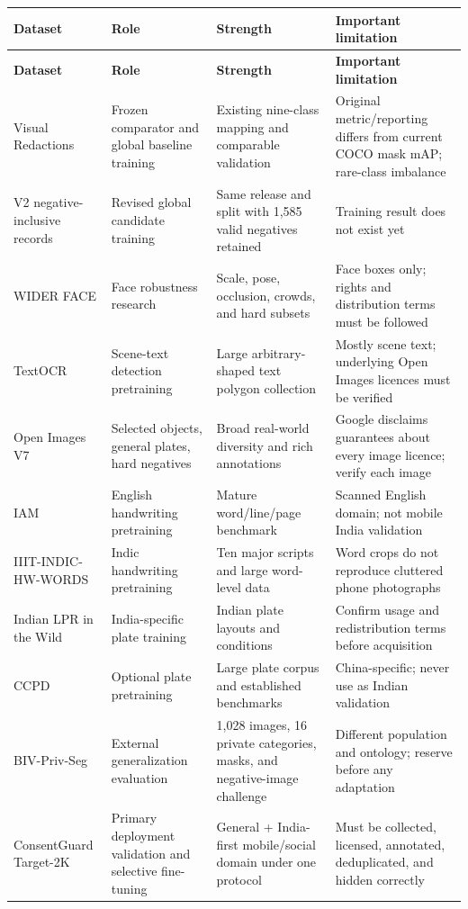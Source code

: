 \begin{longtable}{@{}L{31mm}L{28mm}L{47mm}L{41mm}@{}}
\toprule
\textbf{Dataset} & \textbf{Role} & \textbf{Strength} & \textbf{Important limitation} \\
\midrule
\endfirsthead
\toprule
\textbf{Dataset} & \textbf{Role} & \textbf{Strength} & \textbf{Important limitation} \\
\midrule
\endhead
Visual Redactions & Frozen comparator and global baseline training & Existing nine-class mapping and comparable validation & Original metric/reporting differs from current COCO mask mAP; rare-class imbalance \\
V2 negative-inclusive records & Revised global candidate training & Same release and split with 1,585 valid negatives retained & Training result does not exist yet \\
WIDER FACE & Face robustness research & Scale, pose, occlusion, crowds, and hard subsets & Face boxes only; rights and distribution terms must be followed \\
TextOCR & Scene-text detection pretraining & Large arbitrary-shaped text polygon collection & Mostly scene text; underlying Open Images licences must be verified \\
Open Images V7 & Selected objects, general plates, hard negatives & Broad real-world diversity and rich annotations & Google disclaims guarantees about every image licence; verify each image \citep{openimagesv7} \\
IAM & English handwriting pretraining & Mature word/line/page benchmark & Scanned English domain; not mobile India validation \\
IIIT-INDIC-HW-WORDS & Indic handwriting pretraining & Ten major scripts and large word-level data & Word crops do not reproduce cluttered phone photographs \\
Indian LPR in the Wild & India-specific plate training & Indian plate layouts and conditions & Confirm usage and redistribution terms before acquisition \\
CCPD & Optional plate pretraining & Large plate corpus and established benchmarks & China-specific; never use as Indian validation \\
BIV-Priv-Seg & External generalization evaluation & 1,028 images, 16 private categories, masks, and negative-image challenge & Different population and ontology; reserve before any adaptation \citep{tseng2025biv} \\
ConsentGuard Target-2K & Primary deployment validation and selective fine-tuning & General + India-first mobile/social domain under one protocol & Must be collected, licensed, annotated, deduplicated, and hidden correctly \\
\bottomrule
\end{longtable}

